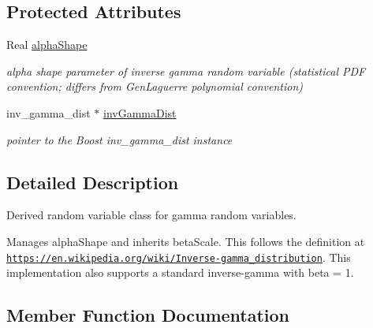 \subsection*{Protected Attributes}
\begin{DoxyCompactItemize}
\item 
Real \hyperlink{classPecos_1_1InvGammaRandomVariable_af2fa8d657b4ae8750d30b09f10760799}{alpha\+Shape}\label{classPecos_1_1InvGammaRandomVariable_af2fa8d657b4ae8750d30b09f10760799}

\begin{DoxyCompactList}\small\item\em alpha shape parameter of inverse gamma random variable (statistical P\+DF convention; differs from Gen\+Laguerre polynomial convention) \end{DoxyCompactList}\item 
inv\+\_\+gamma\+\_\+dist $\ast$ \hyperlink{classPecos_1_1InvGammaRandomVariable_ada70ebb3be086d76c24fa4d684aca901}{inv\+Gamma\+Dist}\label{classPecos_1_1InvGammaRandomVariable_ada70ebb3be086d76c24fa4d684aca901}

\begin{DoxyCompactList}\small\item\em pointer to the Boost inv\+\_\+gamma\+\_\+dist instance \end{DoxyCompactList}\end{DoxyCompactItemize}


\subsection{Detailed Description}
Derived random variable class for gamma random variables. 

Manages alpha\+Shape and inherits beta\+Scale. This follows the definition at \href{https://en.wikipedia.org/wiki/Inverse-gamma_distribution}{\tt https\+://en.\+wikipedia.\+org/wiki/\+Inverse-\/gamma\+\_\+distribution}. This implementation also supports a standard inverse-\/gamma with beta = 1. 

\subsection{Member Function Documentation}
